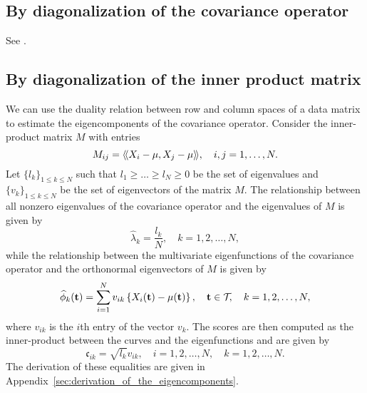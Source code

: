 \subsection{By diagonalization of the covariance operator} %
\label{sub:by_diagonalization_of_the_covariance_operator}

See \cite{happMultivariateFunctionalPrincipal2015}.


\subsection{By diagonalization of the inner product matrix} %
\label{sub:by_diagonalization_of_the_inner_product_matrix}

We can use the duality relation between row and column spaces of a data matrix to estimate the eigencomponents of the covariance operator. Consider the inner-product matrix $M$ with entries
\begin{equation}
    M_{ij} = \langle\!\langle X_i - \mu, X_j - \mu\rangle\!\rangle, \quad i, j = 1, \dots, N.
\end{equation}
Let $\{l_k\}_{1 \leq k \leq N}$ such that $l_1 \geq \dots \geq l_N \geq 0$ be the set of eigenvalues and $\{v_k\}_{1 \leq k \leq N}$ be the set of eigenvectors of the matrix $M$. The relationship between all nonzero eigenvalues of the covariance operator and the eigenvalues of $M$ is given by
\begin{equation}\label{eq:eigenvalues_relation_p}
    \widehat{\lambda}_k = \frac{l_k}{N}, \quad k = 1, 2, \dots, N,
\end{equation}
while the relationship between the multivariate eigenfunctions of the covariance operator and the orthonormal eigenvectors of $M$ is given by
\begin{equation}\label{eq:eigenfunction_relation_p}
    \widehat{\phi}_k(\mathbf{t}) = \sum_{i = 1}^N v_{ik}\left\{X_i(\mathbf{t}) - \mu(\mathbf{t})\right\}, \quad \mathbf{t} \in \mathcal{T}_{}, \quad k = 1, 2, \dots, N, 
\end{equation}
where $v_{ik}$ is the $i$th entry of the vector $v_k$. The scores are then computed as the inner-product between the curves and the eigenfunctions and are given by
\begin{equation}\label{eq:scores_relation_p}
    \mathfrak{c}_{ik} = \sqrt{l_k}v_{ik}, \quad i = 1, 2, \dots, N, \quad k = 1, 2, \dots, N. 
\end{equation}
The derivation of these equalities are given in Appendix~\ref{sec:derivation_of_the_eigencomponents}.

